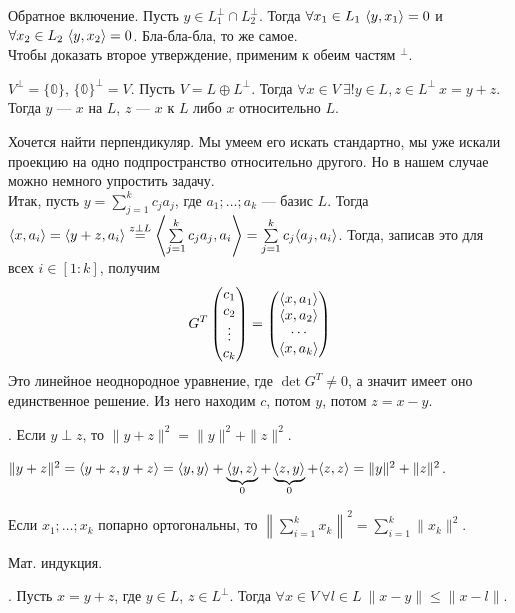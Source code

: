 \documentclass{article}
\begin{document}
\begin{itemize}
\begin{Proof}
            Обратное включение. Пусть $y\in L_1^\perp\cap L_2^\perp$. Тогда $\forall x_1\in L_1~{\left\langle{y},{x_1}\right\rangle}=0$ и $\forall x_2\in L_2~{\left\langle{y},{x_2}\right\rangle}=0$. Бла-бла-бла, то же самое.\\
            Чтобы доказать второе утверждение, применим к обеим частям ${}^\perp$.
        \end{Proof}
        \thm $V^\perp=\{\mathbb0\}$, $\{\mathbb0\}^\perp=V$.
        \dfn Пусть $V=L\oplus L^\perp$. Тогда $\forall x\in V~\exists!y\in L,z\in L^\perp~x=y+z$. Тогда $y$ ---  $x$ на $L$, $z$ ---  $x$ к $L$ либо  $x$ относительно $L$.
        \begin{Comment}
            Хочется найти перпендикуляр. Мы умеем его искать стандартно, мы уже искали проекцию на одно подпространство относительно другого. Но в нашем случае можно немного упростить задачу.\\
            Итак, пусть $y=\sum\limits_{j=1}^kc_ja_j$, где $a_1;\ldots;a_k$ --- базис $L$. Тогда ${\left\langle{x},{a_i}\right\rangle}={\left\langle{y+z},{a_i}\right\rangle}\overset{z\perp L}={\left\langle{\sum\limits_{j=1}^kc_ja_j},{a_i}\right\rangle}=\sum\limits_{j=1}^kc_j{\left\langle{a_j},{a_i}\right\rangle}$. Тогда, записав это для всех $i\in[1:k]$, получим
            $$
            G^T\left(\begin{matrix}c_1\\c_2\\\vdots\\c_k\end{matrix}\right)=\left(\begin{matrix}{\left\langle{x},{a_1}\right\rangle}\\{\left\langle{x},{a_2}\right\rangle}\\\cdots\\{\left\langle{x},{a_k}\right\rangle}\end{matrix}\right)
            $$
            Это линейное неоднородное уравнение, где $\det G^T\neq0$, а значит имеет оно единственное решение. Из него находим $c$, потом $y$, потом $z=x-y$.
        \end{Comment}
        \thm {}. Если $y\perp z$, то $\|y+z\|^2=\|y\|^2+\|z\|^2$.
        \begin{Proof}
            $\|y+z\|^2={\left\langle{y+z},{y+z}\right\rangle}={\left\langle{y},{y}\right\rangle}+\underbrace{{\left\langle{y},{z}\right\rangle}}_0+\underbrace{{\left\langle{z},{y}\right\rangle}}_0+{\left\langle{z},{z}\right\rangle}=\|y\|^2+\|z\|^2$.
        \end{Proof}
        \thm Если $x_1;\ldots;x_k$ попарно ортогональны, то $\left\|\sum\limits_{i=1}^kx_k\right\|^2=\sum\limits_{i=1}^k\|x_k\|^2$.
        \begin{Proof}
            Мат. индукция.
        \end{Proof}
        \thm {}. Пусть $x=y+z$, где $y\in L$, $z\in L^\perp$. Тогда $\forall x\in V~\forall l\in L~\|x-y\|\leqslant\|x-l\|$.

\end{itemize}
\end{document}
